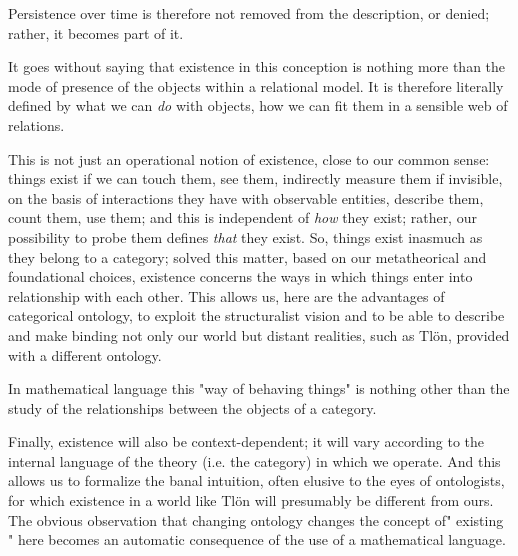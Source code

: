 Persistence over time is therefore not removed from the description, or denied; rather, it becomes part of it.%

It goes without saying that existence in this conception is nothing more than the mode of presence of the objects within a relational model. It is therefore literally defined by what we can \emph{do} with objects, how we can fit them in a sensible web of relations.

This is not just an operational notion of existence, close to our common sense: things exist if we can touch them, see them, indirectly measure them if invisible, on the basis of interactions they have with observable entities, describe them, count them, use them; and this is independent of \emph{how} they exist; rather, our possibility to probe them defines \emph{that} they exist.%
\todo[inline]{}
So, things exist inasmuch as they belong to a category; solved this matter, based on our metatheorical and foundational choices, existence concerns the ways in which things enter into relationship with each other. This allows us, here are the advantages of categorical ontology, to exploit the structuralist vision and to be able to describe and make binding not only our world but distant realities, such as Tl\"on, provided with a different ontology.

In mathematical language this "way of behaving things" is nothing other than the study of the relationships between the objects of a category.

Finally, existence will also be context-dependent; it will vary according to the internal language of the theory (i.e. the category) in which we operate. And this allows us to formalize the banal intuition, often elusive to the eyes of ontologists, for which existence in a world like Tl\"on will presumably be different from ours. The obvious observation that changing ontology changes the concept of" existing " here becomes an automatic consequence of the use of a mathematical language.